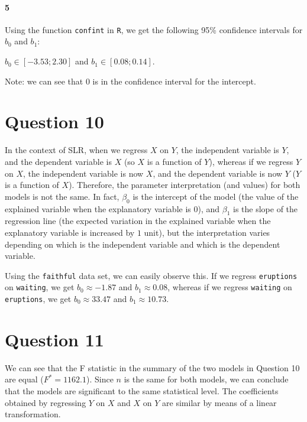 \documentclass[]{article}
\let\oldparagraph\paragraph
\renewcommand{\paragraph}[1]{\oldparagraph{#1}\mbox{}}
\begin{document}
\paragraph{5}
Using the function \texttt{confint} in \texttt{R}, we get the following 95\% confidence intervals for $b_0$ and $b_1$:

$b_0 \in [-3.53; 2.30]$ and $b_1 \in [0.08; 0.14]$.

Note: we can see that $0$ is in the confidence interval for the intercept.

\section*{Question 10}

In the context of SLR, when we regress $X$ on $Y$, the independent variable is $Y$, and the dependent variable is $X$ (so $X$ is a function of $Y$), whereas if we regress $Y$ on $X$, the independent variable is now $X$, and the dependent variable is now $Y$ ($Y$ is a function of $X$). Therefore, the parameter interpretation (and values) for both models is not the same. In fact, $\beta_0$ is the intercept of the model (the value of the explained variable when the explanatory variable is $0$), and $\beta_1$ is the slope of the regression line (the expected variation in the explained variable when the explanatory variable is increased by $1$ unit), but the interpretation varies depending on which is the independent variable and which is the dependent variable.

Using the \texttt{faithful} data set, we can easily observe this. If we regress \texttt{eruptions} on \texttt{waiting}, we get $b_0 \approx -1.87$ and $b_1 \approx 0.08$, whereas if we regress \texttt{waiting} on \texttt{eruptions}, we get $b_0 \approx 33.47$ and $b_1 \approx 10.73$.

\section*{Question 11}

We can see that the F statistic in the summary of the two models in Question 10 are equal ($F^* = 1162.1$). Since $n$ is the same for both models, we can conclude that the models are significant to the same statistical level. The coefficients obtained by regressing $Y$ on $X$ and $X$ on $Y$ are similar by means of a linear transformation.
\end{document}

